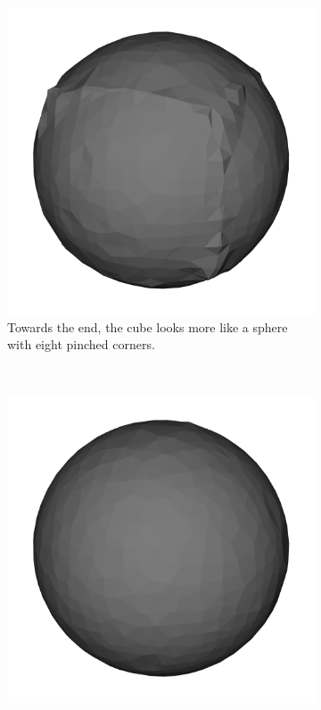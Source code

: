 \begin{figure}
        \begin{subfigure}[t]{0.4\textwidth}
                \includegraphics[width=\textwidth]{img/maya2.png}
                \caption{Towards the end, the cube looks more like a sphere with
                         eight pinched corners.}
                \label{fig:Maya2}
        \end{subfigure}%
        ~ %
        \begin{subfigure}[t]{0.4\textwidth}
                \includegraphics[width=\textwidth]{img/maya3.png}

\end{subfigure}
\end{figure}
